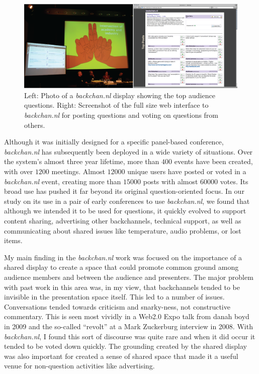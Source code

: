 \documentclass{tufte-handout}
\begin{document}
\begin{figure}[t]
	\includegraphics{figures/backchannl.png}
	\caption{Left: Photo of a \emph{backchan.nl} display showing the top audience questions. Right: Screenshot of the full size web interface to \emph{backchan.nl} for posting questions and voting on questions from others.}
	\label{fig:backchannl}
\end{figure}


Although it was initially designed for a specific panel-based conference, \emph{backchan.nl} has subsequently been deployed in a wide variety of situations. Over the system's almost three year lifetime, more than $400$ events have been created, with over $1200$ meetings. Almost $12000$ unique users have posted or voted in a \emph{backchan.nl} event, creating more than $15000$ posts with almost $60000$ votes. Its broad use has pushed it far beyond its original question-oriented focus. In our study on its use in a pair of early conferences to use \emph{backchan.nl}, we found that although we intended it to be used for questions, it quickly evolved to support content sharing, advertising other backchannels, technical support, as well as communicating about shared issues like temperature, audio problems, or lost items.

My main finding in the \emph{backchan.nl} work was focused on the importance of a shared display to create a space that could promote common ground among audience members and between the audience and presenters. The major problem with past work in this area was, in my view, that backchannels tended to be invisible in the presentation space itself. This led to a number of issues. Conversations tended towards criticism and snarky-ness, not constructive commentary. This is seen most vividly in a Web2.0 Expo talk from danah boyd in 2009  and the so-called ``revolt'' at a Mark Zuckerburg interview in 2008. With \emph{backchan.nl}, I found this sort of discourse was quite rare and when it did occur it tended to be voted down quickly. The grounding created by the shared display was also important for created a sense of shared space that made it a useful venue for non-question activities like advertising. 
\end{document}
